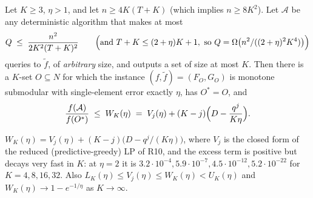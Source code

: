 \begin{theorem}\label{thm:f3}
Let $K\ge3$, $\eta>1$, and let $n\ge4K(T+K)$ (which implies $n\ge8K^{2}$).  Let $\mathcal A$ be any
deterministic algorithm that makes at most
\[
  Q\;\le\;\frac{n^{2}}{2K^{2}(T+K)^{2}}
  \qquad\Bigl(\text{and } T+K\le(2+\eta)K+1,\ \text{so } Q=\Omega\bigl(n^{2}/((2+\eta)^{2}K^{4})\bigr)\Bigr)
\]
queries to $\tilde f$, of \emph{arbitrary} size, and outputs a set of size at
most $K$.  Then there is a $K$-set $O\subseteq N$ for which the instance
$(f,\tilde f)=(F_O,G_O)$ is monotone submodular with single-element error
exactly $\eta$, has $O^{\ast}=O$, and
\[
  \frac{f(\mathcal A)}{f(O^{\ast})}\;\le\;W_K(\eta)
  \;=\;V_j(\eta)+(K-j)\Bigl(D-\frac{q^{j}}{K\eta}\Bigr).
\]
\end{theorem}

\begin{remark}\label{rem:f3-constant}
$W_K(\eta)=V_j(\eta)+(K-j)\bigl(D-q^{j}/(K\eta)\bigr)$, where $V_j$ is the
closed form of the reduced (predictive-greedy) LP of R10, and the excess term is
positive but decays very fast in $K$: at $\eta=2$ it is
$3.2\cdot10^{-4},5.9\cdot10^{-7},4.5\cdot10^{-12},5.2\cdot10^{-22}$ for
$K=4,8,16,32$.  Also $L_K(\eta)\le V_j(\eta)\le W_K(\eta)<U_K(\eta)$ and
$W_K(\eta)\to1-e^{-1/\eta}$ as $K\to\infty$.
\end{remark}

